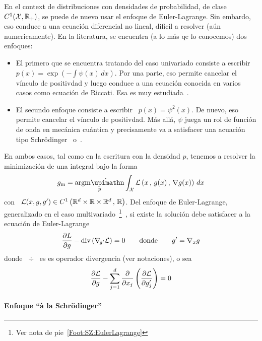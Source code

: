 En  el  context de  distribuciones  con  densidades  de probabilidad,  de  clase
$C^1(\mathcal{X},\mathbb{R}_+)$,  se puede  de nuevo  usar el  enfoque de  Euler-Lagrange. Sin
embardo, eso conduce a una ecuaci\'on  diferencial no lineal, dificil a resolver
(a\'un  numericamente).  En la  literatura, se  encuentra  (a  lo m\'as  qe  lo
conocemos) dos enfoques:
%
\begin{itemize}
\item El primero que  se encuentra tratando del caso univariado  consiste a escribir \
$\displaystyle p(x) = \exp\left( - \int  \psi(x) \, dx \right)$.  Por una parte,
eso permite cancelar el v\'inculo de positivdad y luego conduce a una ecuaci\'on
conocida   en  varios   casos  como   ecuaci\'on   de  Riccati.    Esa  es   muy
estudiada~\cite{BorLew96, BorLew96, Ziv98, FriPla99}.
%
\item El secundo enfoque  consiste a escribir \ $p(x) =  \psi^2(x)$. De nuevo, eso permite cancelar el v\'inculo de positivdad. M\'as all\'a, $\psi$ juega un rol de funci\'on de onda en mec\'anica cu\'antica y precisamente va a satisfacer una acuaci\'on tipo Schr\"odinger~\cite{Fri89, Fri90, FriSof95, FriPla99, FriPla02, Fri98, Fri04} o~\cite{BorLew96, BorLew95, BerVig09}.
\end{itemize}


En ambos casos, tal como en la escritura con la densidad $p$, tenemos a resolver
la minimizaci\'on de una integral bajo la forma
%
\[
g_{\mathrm{m}} = \argmin_p \int_\X \L\left( x \, , \, g(x) \, , \, \nabla g(x) \right) \, dx
\]
%
con \ $\mathcal{L}(x,g,g') \in C^1\left( \mathbb{R}^d \times \mathbb{R} \times \mathbb{R}^d \, , \, \mathbb{R} \right)$.
Del     enfoque    de     Euler-Lagrange,     generalizado     en    el     caso
multivariado~\footnote{Ver                        nota                        de
pie~\ref{Foot:SZ:EulerLagrange}}~\cite{GelFom63, Wei74, Bru04,  Cla13, Kom1}, si
existe la soluci\'on debe satisfacer a la ecuaci\'on de Euler-Lagrange
%
\[
 \frac{\partial L}{\partial g} - \operatorname{div} \left( \nabla_{\! g'} \mathcal{L} \right) = 0  \qquad \mbox{donde}  \qquad  g' =  \nabla_x g
\]
%
donde \ $\div$ \ es es operador divergencia (ver notaciones), o sea
%
\[
\frac{\partial \mathcal{L}}{\partial g} - \sum_{j=1}^d \frac{\partial}{\partial x_j} \left( \frac{\partial \mathcal{L}}{\partial  g'_j}
\right) = 0
\]






\paragraph{Enfoque ``\`a la Schr\"odinger''}

